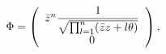 \begin{equation}
\Phi=\left(
\begin{array}
[c]{c}%
\bar{z}^{n}\dfrac{1}{\sqrt{\prod_{l=1}^{n}(\bar{z}z+l\theta)}}\\
0
\end{array}
\right) , \label{phi1}%
\end{equation}

